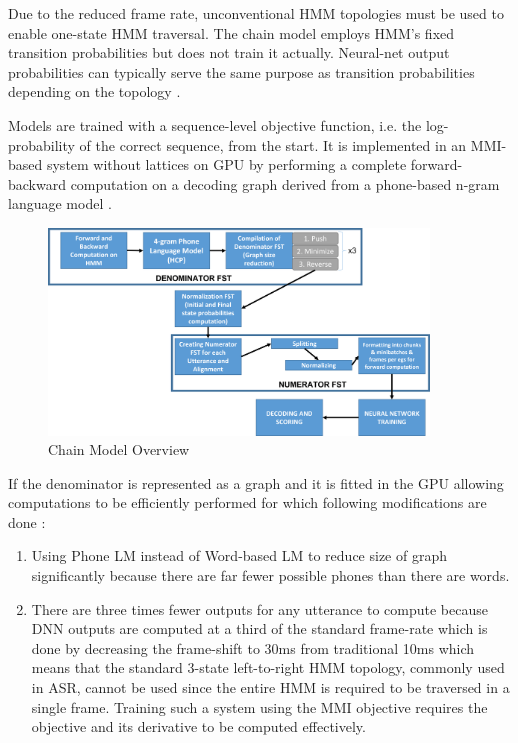 Due to the reduced frame rate, unconventional HMM topologies must be used to enable one-state HMM traversal. The chain model employs HMM's fixed transition probabilities but does not train it actually. Neural-net output probabilities can typically serve the same purpose as transition probabilities depending on the topology \cite{daniel_povey_kaldi_nodate}.

Models are trained with a sequence-level objective function, i.e. the log-probability of the correct sequence, from the start. It is implemented in an MMI-based system without lattices on GPU by performing a complete forward-backward computation on a decoding graph derived from a phone-based n-gram language model \cite{povey_purely_2016}. 

\begin{figure}[h]
    \centering
    \includegraphics[width=0.9\textwidth]{img/ChainTrg.png}
    \caption{Chain Model Overview}
    \label{fig:chain-overview}
\end{figure}


If the denominator is represented as a graph and it is fitted in the GPU allowing computations to be efficiently performed for which following modifications are done \cite{noauthor_lattice_nodate, wiesner_lattice_2020}:

\begin{enumerate}
    \item Using Phone LM instead of Word-based LM to reduce size of graph significantly because there are far fewer possible phones than there are words.
    \item There are three times fewer outputs for any utterance to compute because DNN outputs are computed at a third of the standard frame-rate \cite{povey_purely_2016} which is done by decreasing the frame-shift to 30ms from traditional 10ms which means that the standard 3-state left-to-right HMM topology, commonly used in ASR, cannot be used since the entire HMM is required to be traversed in a single frame. Training such a system using the MMI objective requires the objective and its derivative to be computed effectively. 
    
\end{enumerate}

